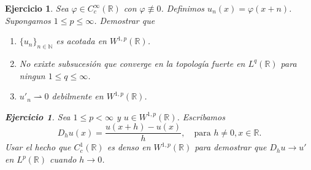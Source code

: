 \documentclass{article}
\newcounter{ejer}
\newtheorem{ejercicio}[ejer]{Ejercicio}}
\newcommand{\rr}{\mathbb{R}}
\newcommand{\nn}{\mathbb{N}}
\begin{document}
\begin{ejercicio}  Sea $\varphi\in C_c^{\infty}(\rr)$ con $\varphi\not\equiv 0$. Definimos $u_n(x)=\varphi(x+n)$. Supongamos $1\leq p\leq \infty$. Demostrar que
 \begin{enumerate}
  \item $\{u_n\}_{n\in\nn}$ es acotada en $W^{1,p}(\rr)$.
  \item No exixte subsucesión que converge en la topología fuerte en  $L^q(\rr)$ para ningun  $1\leq q\leq \infty$.
   \item $ u'_{n} \rightharpoonup 0$ debilmente en $W^{1,p}(\rr)$.
 \end{enumerate}


\begin{ejercicio} Sea $1\leq p<\infty$ y $u\in W^{1,p}(\rr)$. Escribamos
\[D_hu(x)=\frac{u(x+h)-u(x)}{h},\quad\text{para } h\neq 0, x\in\rr.\]
Usar el hecho que $C_c^1(\rr)$ es denso en $W^{1,p}(\rr)$ para demostrar que $D_hu\to u'$ en $L^p(\rr)$ cuando $h\to 0$.
\end{ejercicio}






\end{ejercicio}
\end{document}
